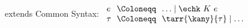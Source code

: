 \begin{flushleft}

 extends Common Syntax:
$\begin{array}{l@{~~}c@{~~}l}
  e & \Coloneqq & \ldots \mid \echk~K~e
\\
  \tau & \Coloneqq & \tarr{\kany}{\tau} \mid \ldots
\end{array}$

\begin{mathpar}



\end{mathpar}

\end{flushleft}
